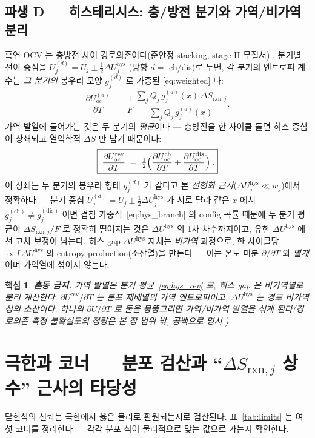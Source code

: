 \documentclass[11pt,a4paper]{article}
\newtheorem*{keybox}{핵심}
\newcommand{\rxn}{\mathrm{rxn}}
\newcommand{\rev}{\mathrm{rev}}
\newcommand{\oc}{\mathrm{oc}}
\newcommand{\hys}{\mathrm{hys}}
\begin{document}
\subsection{파생 D — 히스테리시스: 충/방전 분기와 가역/비가역 분리}\label{ssec:hys}
흑연 OCV 는 충방전 사이 경로의존이다(준안정 stacking, stage II 무질서) \cite{hysteresis2018}. 분기별 전이 중심을
$U_j^{(d)}=U_j\pm\tfrac12\Delta U_j^\hys$ (방향 $d=$ ch/dis)로 두면, 각 분기의 엔트로피 계수는 \emph{그 분기의}
봉우리 모양 $g_j^{(d)}$ 로 가중된 \eqref{eq:weighted} 다:
\begin{equation}
\frac{\partial U_\oc^{(d)}}{\partial T}
\;=\;\frac1F\,\frac{\sum_j Q_j\,g_j^{(d)}(x)\,\Delta S_{\rxn,j}}{\sum_j Q_j\,g_j^{(d)}(x)}.
\label{eq:hys_branch}
\end{equation}
가역 발열에 들어가는 것은 두 분기의 \emph{평균}이다 — 충방전을 한 사이클 돌면 히스 중심이 상쇄되고 열역학적
$\Delta S$ 만 남기 때문이다:
\begin{equation}
\boxed{\;\frac{\partial U_\oc^\rev}{\partial T}
\;=\;\tfrac12\Bigl(\frac{\partial U_\oc^\mathrm{ch}}{\partial T}+\frac{\partial U_\oc^\mathrm{dis}}{\partial T}\Bigr)\;.}
\label{eq:hys_rev}
\end{equation}
이 상쇄는 두 분기의 봉우리 형태 $g_j^{(d)}$ 가 같다고 본 \emph{선형화 근사}($\Delta U_j^\hys\!\ll\!w_j$)에서 정확하다 —
분기 중심 $U_j^{(d)}=U_j\pm\tfrac12\Delta U_j^\hys$ 가 서로 달라 같은 $x$ 에서 $g_j^{(\mathrm{ch})}\!\ne\!g_j^{(\mathrm{dis})}$ 이면
겹침 가중식~\eqref{eq:hys_branch} 의 config 곡률 때문에 두 분기 평균이 $\Delta S_{\rxn,j}/F$ 로 정확히 떨어지는 것은
$\Delta U^\hys$ 의 1차 차수까지이고, 유한 $\Delta U^\hys$ 에선 고차 보정이 남는다.
히스 gap $\Delta U^\hys$ 자체는 \emph{비가역} 과정으로, 한 사이클당 $\propto I\,\Delta U^\hys$ 의 entropy
production(소산열)을 만든다 — 이는 온도 미분 $\partial/\partial T$ 와 \emph{별개}이며 가역열에 섞이지 않는다.
\begin{keybox}
\textbf{혼동 금지.} 가역 발열은 분기 평균~\eqref{eq:hys_rev} 로, 히스 gap 은 비가역열로 \emph{분리} 계산한다.
$\partial U^\rev/\partial T$ 는 분포 재배열의 가역 엔트로피이고, $\Delta U^\hys$ 는 경로 비가역성의 소산이다.
하나의 $\partial U/\partial T$ 로 둘을 뭉뚱그리면 가역/비가역 발열을 섞게 된다(경로의존 측정 불확실도의
정량은 본 장 범위 밖, 공백으로 명시 \cite{hysteresis2018}).
\end{keybox}

\section{극한과 코너 — 분포 검산과 ``$\Delta S_{\rxn,j}$ 상수'' 근사의 타당성}\label{sec:limits}
닫힌식의 신뢰는 극한에서 옳은 물리로 환원되는지로 검산된다. 표~\ref{tab:limits} 는 여섯 코너를 정리한다 —
각각 분포 식이 물리적으로 맞는 값으로 가는지 확인한다.
\end{document}
